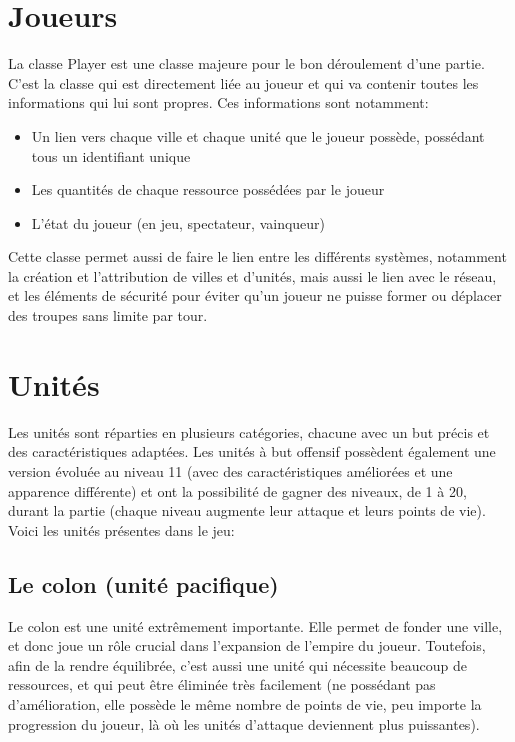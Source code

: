 \documentclass[12pt]{report}
\begin{document}
\section{Joueurs}

La classe Player est une classe majeure pour le bon déroulement d’une partie.
C’est la classe qui est directement liée au joueur et qui va contenir toutes les
informations qui lui sont propres. Ces informations sont notamment:

\begin{itemize}
    \item Un lien vers chaque ville et chaque unité que le joueur possède,
        possédant tous un identifiant unique
    \item Les quantités de chaque ressource possédées par le joueur
    \item L’état du joueur (en jeu, spectateur, vainqueur)
\end{itemize}

Cette classe permet aussi de faire le lien entre les différents systèmes,
notamment la création et l’attribution de villes et d’unités, mais aussi le lien
avec le réseau, et les éléments de sécurité pour éviter qu’un joueur ne puisse
former ou déplacer des troupes sans limite par tour.

\section{Unités}

Les unités sont réparties en plusieurs catégories, chacune avec un but précis et
des caractéristiques adaptées. Les unités à but offensif possèdent également une
version évoluée au niveau 11 (avec des caractéristiques améliorées et une
apparence différente) et ont la possibilité de gagner des niveaux, de 1 à 20,
durant la partie (chaque niveau augmente leur attaque et leurs points de vie).
Voici les unités présentes dans le jeu:

\subsection{Le colon (unité pacifique)}

Le colon est une unité extrêmement importante. Elle permet de fonder une ville,
et donc joue un rôle crucial dans l’expansion de l’empire du joueur. Toutefois,
afin de la rendre équilibrée, c’est aussi une unité qui nécessite beaucoup de
ressources, et qui peut être éliminée très facilement (ne possédant pas
d’amélioration, elle possède le même nombre de points de vie, peu importe la
progression du joueur, là où les unités d’attaque deviennent plus puissantes).
\end{document}
